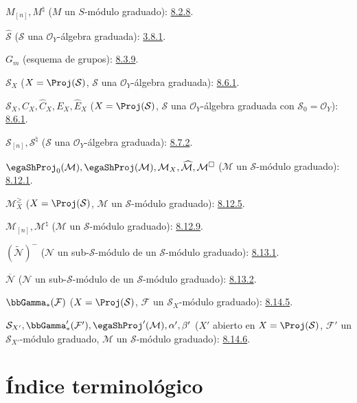 \documentclass[oneside,10pt]{amsart}
\renewcommand{\geq}{\geqslant}
\newcommand{\oldpage}[2][]{\marginnote{\normalfont\footnotesize\textbf{#1}~|~#2}\ignorespaces}
\begin{document}
$M_{[n]},M^\natural$ ($M$ un $S$-módulo graduado): \hyperref[II.8.2.8-fr]{8.2.8}.

$\widehat{\mathcal{S}}$ ($\mathcal{S}$ una $\mathcal{O}_Y$-álgebra graduada): \hyperref[II.8.3.1-fr]{3.8.1}.

$G_m$ (esquema de grupos): \hyperref[II.8.3.9-fr]{8.3.9}.

$\mathcal{S}_X$ ($X=\Proj(\mathcal{S})$, $\mathcal{S}$ una $\mathcal{O}_Y$-álgebra graduada): \hyperref[II.8.6.1-fr]{8.6.1}.

$\mathcal{S}_X,C_X,\widehat C_X,E_X,\widehat E_X$
($X=\Proj(\mathcal{S})$, $\mathcal{S}$ una $\mathcal{O}_Y$-álgebra graduada
con $\mathcal{S}_0=\mathcal{O}_Y$): \hyperref[II.8.6.1-fr]{8.6.1}.

$\mathcal{S}_{[n]},\mathcal{S}^{\natural}$
($\mathcal{S}$ una $\mathcal{O}_Y$-álgebra graduada): \hyperref[II.8.7.2-fr]{8.7.2}.

$\egaShProj_0(\mathcal{M}),\egaShProj(\mathcal{M}),\mathcal{M}_X,
\widehat{\mathcal{M}},\mathcal{M}^{\square}$
($\mathcal{M}$ un $\mathcal{S}$-módulo graduado): \hyperref[II.8.12.1-fr]{8.12.1}.

$\mathcal{M}_X^\geq$
($X=\Proj(\mathcal{S})$, $\mathcal{M}$ un $\mathcal{S}$-módulo graduado): \hyperref[II.8.12.5-fr]{8.12.5}.

$\mathcal{M}_{[n]},\mathcal{M}^{\natural}$
($\mathcal{M}$ un $\mathcal{S}$-módulo graduado): \hyperref[II.8.12.9-fr]{8.12.9}.

$(\widetilde{\mathcal{N}})^-$
($\mathcal{N}$ un sub-$\mathcal{S}$-módulo de un $\mathcal{S}$-módulo graduado): \hyperref[II.8.13.1-fr]{8.13.1}.

$\overline{\mathcal{N}}$
($\mathcal{N}$ un sub-$\mathcal{S}$-módulo de un $\mathcal{S}$-módulo graduado): \hyperref[II.8.13.2-fr]{8.13.2}.

$\bbGamma_*(\mathcal{F})$
($X=\Proj(\mathcal{S})$, $\mathcal{F}$ un $\mathcal{S}_X$-módulo graduado): \hyperref[II.8.14.5-fr]{8.14.5}.

$\mathcal{S}_{X'},\bbGamma'_*(\mathcal{F}'),\egaShProj'(\mathcal{M}),
\alpha',\beta'$
($X'$ abierto en $X=\Proj(\mathcal{S})$, $\mathcal{F}'$ un $\mathcal{S}_{X'}$-módulo graduado,
$\mathcal{M}$ un $\mathcal{S}$-módulo graduado): \hyperref[II.8.14.6-fr]{8.14.6}.

\endgroup

\clearpage
\oldpage[II]{209}
{}
\section*{Índice terminológico}
\end{document}

